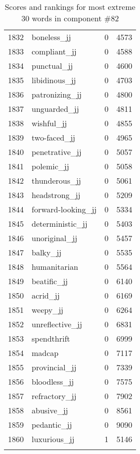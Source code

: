 \begin{longtable}[!htbp]{| rlr@{.}l |}
    1832 & boneless\_jj & 0 & 4573 \\
    1833 & compliant\_jj & 0 & 4588 \\
    1834 & punctual\_jj & 0 & 4600 \\
    1835 & libidinous\_jj & 0 & 4703 \\
    1836 & patronizing\_jj & 0 & 4800 \\
    1837 & unguarded\_jj & 0 & 4811 \\
    1838 & wishful\_jj & 0 & 4855 \\
    1839 & two-faced\_jj & 0 & 4965 \\
    1840 & penetrative\_jj & 0 & 5057 \\
    1841 & polemic\_jj & 0 & 5058 \\
    1842 & thunderous\_jj & 0 & 5061 \\
    1843 & headstrong\_jj & 0 & 5209 \\
    1844 & forward-looking\_jj & 0 & 5334 \\
    1845 & deterministic\_jj & 0 & 5403 \\
    1846 & unoriginal\_jj & 0 & 5457 \\
    1847 & balky\_jj & 0 & 5535 \\
    1848 & humanitarian & 0 & 5564 \\
    1849 & beatific\_jj & 0 & 6140 \\
    1850 & acrid\_jj & 0 & 6169 \\
    1851 & weepy\_jj & 0 & 6264 \\
    1852 & unreflective\_jj & 0 & 6831 \\
    1853 & spendthrift & 0 & 6999 \\
    1854 & madcap & 0 & 7117 \\
    1855 & provincial\_jj & 0 & 7339 \\
    1856 & bloodless\_jj & 0 & 7575 \\
    1857 & refractory\_jj & 0 & 7902 \\
    1858 & abusive\_jj & 0 & 8561 \\
    1859 & pedantic\_jj & 0 & 9090 \\
    1860 & luxurious\_jj & 1 & 5146 \\
    \hline
    \caption{Scores and rankings for most extreme 30 words in component \#82} \\
\end{longtable}
